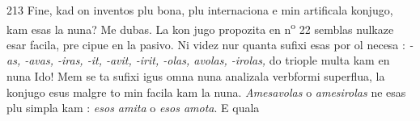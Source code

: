 \begin{VUpage}[217]{213}
Fine, kad on inventos plu bona, plu internaciona e min\nl
artificala konjugo, kam esas la nuna? Me dubas. La kon\cc
jugo propozita en n\textsuperscript{o} 22 semblas nulkaze esar facila, pre\cc
cipue en la pasivo. Ni videz nur quanta sufixi esas por ol\nl
necesa : \textit{-as, -avas, -iras, -it, -avit, -irit, -olas, avolas, -irolas,}\nl
do triople multa kam en nuna Ido! Mem se ta sufixi igus\nl
omna nuna analizala verbformi superflua, la konjugo esus\nl
malgre to min facila kam la nuna. \textit{Amesavolas} o \textit{amesirolas}\nl
ne esas plu simpla kam : \textit{esos amita} o \textit{esos amota}. E quala\nl
\end{VUpage}

